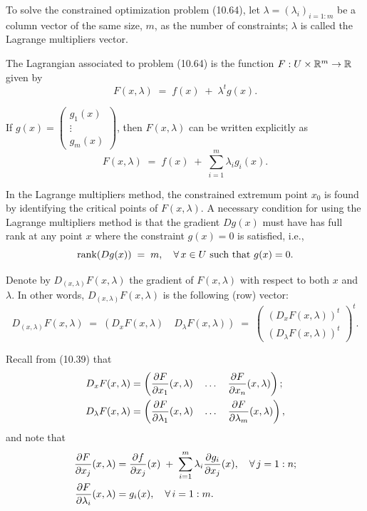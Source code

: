To solve the constrained optimization problem (10.64), let $\lambda =
(\lambda_i)_{i=1:m}$ be a column vector of the same size, $m$, as the number of
constraints; $\lambda$ is called the Lagrange multipliers vector.

The Lagrangian associated to problem (10.64) is the function $F : U \times \mathbb{R}^m \to
\mathbb{R}$ given by
\begin{equation}
F(x,\lambda) \;=\; f(x) \;+\; \lambda^t g(x).
\end{equation}

If $g(x) = \begin{pmatrix} g_1(x) \\ \vdots \\ g_m(x) \end{pmatrix}$, then
$F(x,\lambda)$ can be written explicitly as
\[
F(x,\lambda) \;=\; f(x) \;+\; \sum_{i=1}^m \lambda_ig_i(x).
\]

In the Lagrange multipliers method, the constrained extremum point $x_0$ is found by
identifying the critical points of $F(x,\lambda)$. A necessary condition for using
the Lagrange multipliers method is that the gradient $Dg(x)$ must have
has full rank at any point $x$ where the constraint $g(x) = 0$ is satisfied, i.e.,
\begin{equation}
\operatorname{rank}(Dg(x)) \;=\; m, \quad \forall\, x \in U \text{ such that } g(x) = 0.
\end{equation}

Denote by $D_{(x,\lambda)}F(x,\lambda)$ the gradient of $F(x,\lambda)$ with respect to
both $x$ and $\lambda$. In other words, $D_{(x,\lambda)}F(x,\lambda)$ is the
following (row) vector:
\begin{equation}
D_{(x,\lambda)}F(x,\lambda) \;=\; \left(D_xF(x,\lambda) \quad D_\lambda F(x,\lambda)\right)
\;=\; \begin{pmatrix} (D_xF(x,\lambda))^t \\ (D_\lambda F(x,\lambda))^t \end{pmatrix}^{\!t}.
\end{equation}

Recall from (10.39) that
\begin{align}
D_xF(x,\lambda) &= \left(\frac{\partial F}{\partial x_1}(x,\lambda) \quad \ldots \quad \frac{\partial F}{\partial x_n}(x,\lambda)\right); \\
D_\lambda F(x,\lambda) &= \left(\frac{\partial F}{\partial \lambda_1}(x,\lambda) \quad \ldots \quad \frac{\partial F}{\partial \lambda_m}(x,\lambda)\right),
\end{align}
and note that
\begin{align}
\frac{\partial F}{\partial x_j}(x,\lambda) &= \frac{\partial f}{\partial x_j}(x) \;+\; \sum_{i=1}^m \lambda_i\frac{\partial g_i}{\partial x_j}(x), \quad \forall\, j = 1:n; \\
\frac{\partial F}{\partial \lambda_i}(x,\lambda) &= g_i(x), \quad \forall\, i = 1:m.
\end{align}

